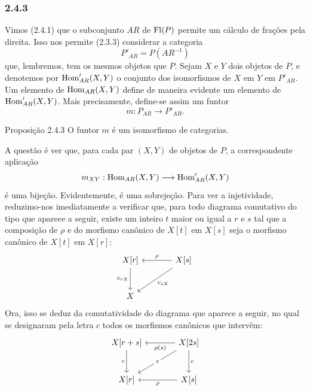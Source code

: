 \subsubsection*{2.4.3}
Vimos (2.4.1) que o subconjunto $AR$ de $\operatorname{Fl}(P)$ permite um cálculo de frações pela direita. Isso nos permite (2.3.3) considerar a categoria
\[
P'_{AR}=P(AR^{-1})
\]
que, lembremos, tem os mesmos objetos que $P$. Sejam $X$ e $Y$ dois objetos de $P$, e denotemos por $\operatorname{Hom}'_{AR}(X,Y)$ o conjunto dos isomorfismos de $X$ em $Y$ em $P'_{AR}$. Um elemento de $\operatorname{Hom}_{AR}(X,Y)$ define de maneira evidente um elemento de $\operatorname{Hom}'_{AR}(X,Y)$. Mais precisamente, define-se assim um funtor
\[
m:P_{AR}\longrightarrow P'_{AR}.
\]

\begin{statement}{Proposição 2.4.3}
O funtor $m$ é um isomorfismo de categorias.
\end{statement}

\begin{prooftext}[Demonstração]
A questão é ver que, para cada par $(X,Y)$ de objetos de $P$, a correspondente aplicação
\[
m_{XY}:\operatorname{Hom}_{AR}(X,Y)\longrightarrow\operatorname{Hom}'_{AR}(X,Y)
\]
é uma bijeção. Evidentemente, é uma sobrejeção. Para ver a injetividade, reduzimo-nos imediatamente a verificar que, para todo diagrama comutativo do tipo que aparece a seguir, existe um inteiro $t$ maior ou igual a $r$ e $s$ tal que a composição de $\rho$ e do morfismo canônico de $X[t]$ em $X[s]$ seja o morfismo canônico de $X[t]$ em $X[r]$:
\[
\begin{tikzcd}[column sep=large,row sep=large]
X[r] \arrow[d,"{v_{rX}}"'] & X[s] \arrow[l,"\rho"'] \arrow[dl,"{v_{sX}}"]\\
X & {}
\end{tikzcd}
\]
Ora, isso se deduz da comutatividade do diagrama que aparece a seguir, no qual se designaram pela letra $c$ todos os morfismos canônicos que intervêm:
\[
\begin{tikzcd}[column sep=large,row sep=large]
X[r+s] \arrow[d,"c"'] & X[2s] \arrow[l,"\rho(s)"] \arrow[d,"c"] \arrow[dl,"c" description]\\
X[r] & X[s] \arrow[l,"\rho"]
\end{tikzcd}
\]
\end{prooftext}
